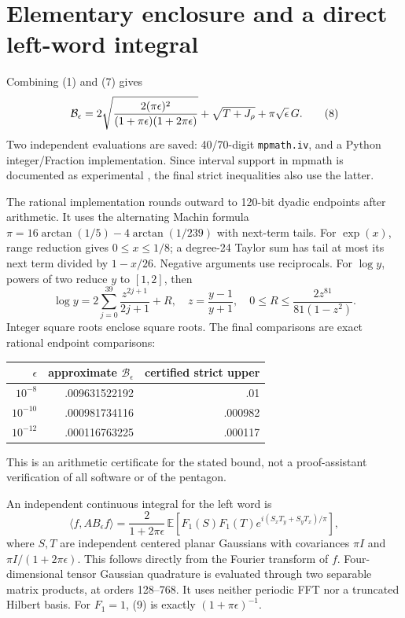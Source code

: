 \documentclass[11pt,a4paper]{article}
\newcommand{\eps}{\epsilon}
\begin{document}
\section{Elementary enclosure and a direct left-word integral}
Combining (1) and (7) gives
\[
 {\cal B}_\eps=
 2\sqrt{\frac{2(\pi\eps)^2}{(1+\pi\eps)(1+2\pi\eps)}}
 +\sqrt{T+J_\rho}+\pi\sqrt\eps\,G. \tag{8}
\]
Two independent evaluations are saved: 40/70-digit
\texttt{mpmath.iv}, and a Python integer/Fraction implementation.
Since interval support in mpmath is documented as experimental
\cite{mpmath}, the final strict inequalities also use the latter.

The rational implementation rounds outward to 120-bit dyadic
endpoints after arithmetic. It uses the alternating Machin formula
$\pi=16\arctan(1/5)-4\arctan(1/239)$ with next-term tails.
For $\exp(x)$, range reduction gives $0\leq x\leq1/8$; a degree-24
Taylor sum has tail at most its next term divided by $1-x/26$.
Negative arguments use reciprocals.
For $\log y$, powers of two reduce $y$ to $[1,2]$, then
\[
 \log y=2\sum_{j=0}^{39}\frac{z^{2j+1}}{2j+1}+R,\quad
 z=\frac{y-1}{y+1},\quad
 0\leq R\leq\frac{2z^{81}}{81(1-z^2)}.
\]
Integer square roots enclose square roots. The final comparisons
are exact rational endpoint comparisons:
\begin{center}
\begin{tabular}{rrr}
\toprule
$\eps$ & approximate $\mathcal B_\eps$ & certified strict upper\\
\midrule
$10^{-8}$ & .009631522192 & .01\\
$10^{-10}$ & .000981734116 & .000982\\
$10^{-12}$ & .000116763225 & .000117\\
\bottomrule
\end{tabular}
\end{center}
This is an arithmetic certificate for the stated bound, not a
proof-assistant verification of all software or of the pentagon.

An independent continuous integral for the left word is
\[
 \langle f,AB_\eps f\rangle=
 \frac{2}{1+2\pi\eps}\,
 \mathbb E\!\left[
 F_1(S)F_1(T)
 e^{i(S_xT_y+S_yT_x)/\pi}\right], \tag{9}
\]
where $S,T$ are independent centered planar Gaussians with
covariances $\pi I$ and $\pi I/(1+2\pi\eps)$.
This follows directly from the Fourier transform of $f$.
Four-dimensional tensor Gaussian quadrature is evaluated through
two separable matrix products, at orders 128--768.
It uses neither periodic FFT nor a truncated Hilbert basis.
For $F_1=1$, (9) is exactly $(1+\pi\eps)^{-1}$.
\end{document}
